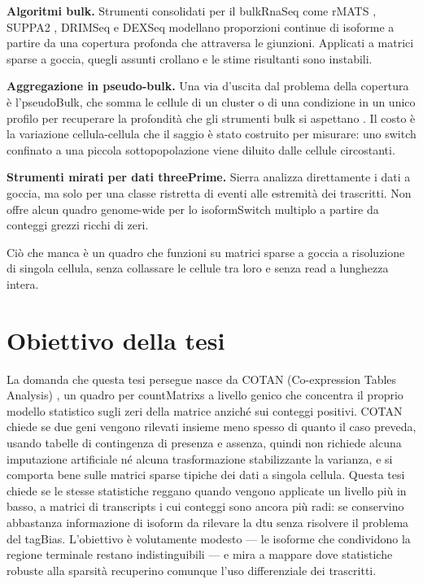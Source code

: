 \textbf{Algoritmi bulk.} Strumenti consolidati per il \gls{bulkRnaSeq} come rMATS \cite{shen2014rmats}, SUPPA2 \cite{trincado2018suppa}, DRIMSeq \cite{nowicka2016drimseq} e DEXSeq \cite{anders2012dexseq} modellano proporzioni continue di isoforme a partire da una copertura profonda che attraversa le giunzioni. Applicati a matrici sparse a goccia, quegli assunti crollano e le stime risultanti sono instabili.

\textbf{Aggregazione in pseudo-bulk.} Una via d'uscita dal problema della copertura è l'\gls{pseudoBulk}, che somma le cellule di un cluster o di una condizione in un unico profilo per recuperare la profondità che gli strumenti bulk si aspettano \cite{gilis2021satuRn, tekath2021dturtle}. Il costo è la variazione cellula-cellula che il saggio è stato costruito per misurare: uno switch confinato a una piccola sottopopolazione viene diluito dalle cellule circostanti.

\textbf{Strumenti mirati per dati \gls{threePrime}.} Sierra \cite{patrick2020sierra} analizza direttamente i dati a goccia, ma solo per una classe ristretta di eventi alle estremità dei trascritti. Non offre alcun quadro genome-wide per lo \gls{isoformSwitch} multiplo a partire da conteggi grezzi ricchi di zeri.

Ciò che manca è un quadro che funzioni su matrici sparse a goccia a risoluzione di singola cellula, senza collassare le cellule tra loro e senza read a lunghezza intera.

\section{Obiettivo della tesi}

La domanda che questa tesi persegue nasce da COTAN (Co-expression Tables Analysis) \cite{galfre2021cotan}, un quadro per \glspl{countMatrix} a livello genico che concentra il proprio modello statistico sugli zeri della matrice anziché sui conteggi positivi. COTAN chiede se due geni vengono rilevati insieme meno spesso di quanto il caso preveda, usando tabelle di contingenza di presenza e assenza, quindi non richiede alcuna imputazione artificiale né alcuna trasformazione stabilizzante la varianza, e si comporta bene sulle matrici sparse tipiche dei dati a singola cellula. Questa tesi chiede se le stesse statistiche reggano quando vengono applicate un livello più in basso, a matrici di \glspl{transcript} i cui conteggi sono ancora più radi: se conservino abbastanza informazione di \gls{isoform} da rilevare la \gls{dtu} senza risolvere il problema del \gls{tagBias}. L'obiettivo è volutamente modesto --- le isoforme che condividono la regione terminale restano indistinguibili --- e mira a mappare dove statistiche robuste alla sparsità recuperino comunque l'uso differenziale dei trascritti.

